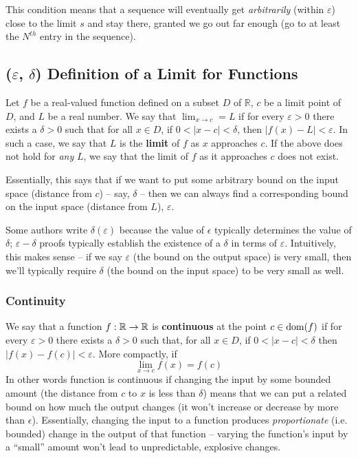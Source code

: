 This condition means that a sequence will eventually get \textit{arbitrarily} (within $\varepsilon$) close to the limit $s$ and stay there, granted we go out far enough (go to at least the $N^{th}$ entry in the sequence).

\subsection{($\varepsilon$, $\delta$) Definition of a Limit for Functions}

Let $f$ be a real-valued function defined on a subset $D$ of $\mathbb{R}$, $c$ be a limit point of $D$, and $L$ be a real number. We say that $\lim_{x \to c} = L$ if for every $\varepsilon > 0$ there exists a $\delta > 0$ such that for all $x \in D$, if $0 < |x - c| < \delta$, then $|f(x) - L| < \varepsilon$. In such a case, we say that $L$ is the \textbf{limit} of $f$ as $x$ approaches $c$. If the above does not hold for \textit{any} $L$, we say that the limit of $f$ as it approaches $c$ does not exist.

Essentially, this says that if we want to put some arbitrary bound on the input space (distance from $c$) -- say, $\delta$ -- then we can always find a corresponding bound on the input space (distance from $L$), $\varepsilon$.

Some authors write $\delta(\varepsilon)$ because the value of $\epsilon$ typically determines the value of $\delta$; $\varepsilon-\delta$ proofs typically establish the existence of a $\delta$ in terms of $\varepsilon$. Intuitively, this makes sense -- if we say $\varepsilon$ (the bound on the output space) is very small, then we'll typically require $\delta$ (the bound on the input space) to be very small as well.

\subsubsection{Continuity}

We say that a function $f : \mathbb{R} \to \mathbb{R}$ is \textbf{continuous} at the point $c \in \operatorname{dom}(f)$ if for every $\varepsilon > 0$ there exists a $\delta > 0$ such that, for all $x \in D$, if $0 < |x - c| < \delta$ then $|f(x) - f(c)| < \varepsilon$. More compactly, if $$\lim_{x \to c} f(x) = f(c)$$ In other words function is continuous if changing the input by some bounded amount (the distance from $c$ to $x$ is less than $\delta$) means that we can put a related bound on how much the output changes (it won't increase or decrease by more than $\epsilon$). Essentially, changing the input to a function produces \textit{proportionate} (i.e. bounded) change in the output of that function -- varying the function's input by a ``small'' amount won't lead to unpredictable, explosive changes.

